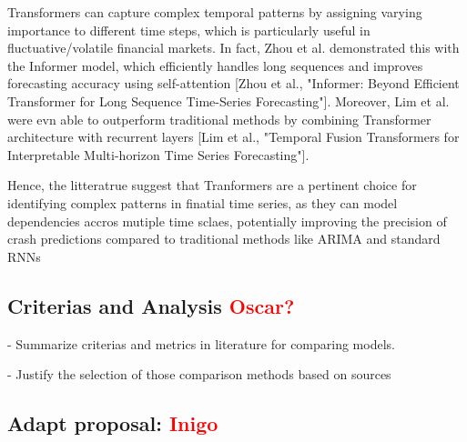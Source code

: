 \documentclass[12pt, letterpaper]{article}
\begin{document}
Transformers can capture complex temporal patterns by assigning varying importance to different time steps, which is particularly useful in fluctuative/volatile financial markets. In fact, Zhou et al. demonstrated this with the Informer model, which efficiently handles long sequences and improves forecasting accuracy using self-attention [Zhou et al., "Informer: Beyond Efficient Transformer for Long Sequence Time-Series Forecasting"]. Moreover, Lim et al.  were evn able to outperform traditional methods by combining Transformer architecture with recurrent layers [Lim et al., "Temporal Fusion Transformers for Interpretable Multi-horizon Time Series Forecasting"].

Hence, the litteratrue suggest that Tranformers are a pertinent choice for identifying complex patterns in finatial time series, as they can model dependencies accros mutiple time sclaes, potentially improving the precision of crash predictions compared to traditional methods like ARIMA and standard RNNs



\subsection*{Criterias and Analysis \textcolor{red}{Oscar?}}
- Summarize criterias and metrics in literature for comparing models.

- Justify the selection of those comparison methods based on sources



\subsection*{Adapt proposal: \textcolor{red}{Inigo}}
\end{document}
